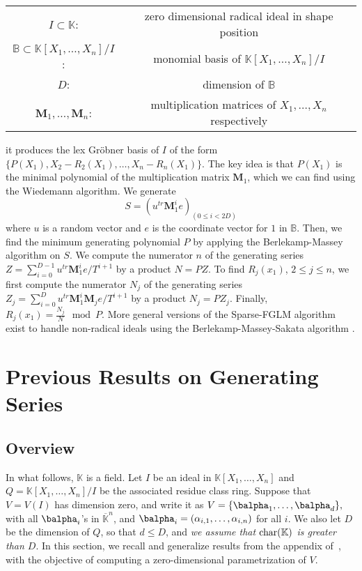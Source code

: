 \documentclass[12pt]{article}
\def\K {\ensuremath{\mathbb{K}}}
\def\Kbar {{\ensuremath{\overline{\mathbb{K}}}}}
\def\D {\ensuremath{D}}
\def\K{\mathbb{K}}
\def\mM{\mathbf{M}}
\begin{document}
\begin{center}
\begin{tabular}{c c}
	$I \subset \mathbb{K}$:& zero dimensional radical ideal
	in shape position\\
	$\mathbb{B} \subset \mathbb{K}[X_1,\dots,X_n]/I$:&
	monomial basis of $\mathbb{K}[X_1,\dots,X_n]/I$\\
	$D$: & dimension of $\mathbb{B}$\\
	$\mM_1,\dots,\mM_n$:& multiplication matrices of
	$X_1,\dots,X_n$ respectively	
\end{tabular}
\end{center}
it produces the lex Gr\"obner basis of $I$ of the form
$\{ P(X_1), X_2-R_2(X_1),\dots, X_n - R_n(X_1)  \}$.
The key idea is that $P(X_1)$ is the minimal polynomial
of the multiplication matrix $\mM_1$, which we can
find using the Wiedemann algorithm. We generate
$$ S = (u^{tr} \mM^i_1 e)_{(0 \le i < 2D)}$$
where $u$ is a random vector and $e$ is the coordinate
vector for $1$ in $\mathbb{B}$. Then, we find the minimum
generating polynomial $P$ by
applying the Berlekamp-Massey algorithm on $S$.
We compute the numerator $n$ of the generating series
$Z = \sum_{i=0}^{D-1} u^{tr} \mM^i_1 e/T^{i+1}$ by a product
$N = P Z$. To find $R_j(x_1)$, $2 \le j \le n$, we first
compute the numerator $N_j$ of the generating series
$Z_j = \sum_{i=0}^{D} u^{tr} \mM_1^i \mM_j e / T^{i+1}$ by a product
$N_j = P Z_j$. Finally, $R_j(x_1) = \frac{N_j}{N} \mod P$.
More general versions of the Sparse-FGLM algorithm exist to handle
non-radical ideals using the Berlekamp-Massey-Sakata algorithm \cite{FaMo17}.

\newpage
\section{Previous Results on Generating Series}

\subsection{Overview}
In what follows, $\K$ is a field.  Let $I$ be an ideal in
$\K[X_1,\dots,X_n]$ and $Q=\K[X_1,\dots,X_n]/I$ be the associated
residue class ring. Suppose that $V=V(I)$ has dimension zero, and
write it as $V=\{\balpha_1,\dots,\balpha_d\},$ with all $\balpha_i$'s
in $\Kbar^n$, and $\balpha_i=(\alpha_{i,1},\dots,\alpha_{i,n})$ for
all $i$.  We also let $\D$ be the dimension of $Q$, so that $d \le
\D$, and {\em we assume that ${\rm char}(\K)$ is greater than $D$}. In
this section, we recall and generalize results from the appendix
of~\cite{BoSaSc03}, with the objective of computing a zero-dimensional
parametrization of $V$.
\end{document}
